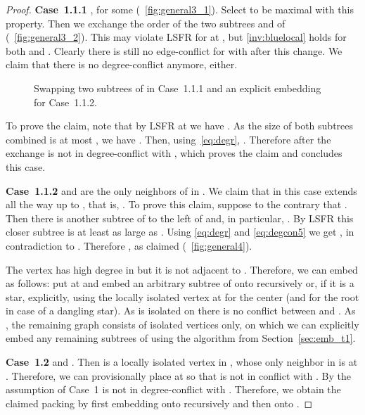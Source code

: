 \documentclass[11pt,a4paper,colorlinks=true,urlcolor=blue,citecolor=red]{article}
\theoremstyle{plain}
\newcommand{\case}[1]{\par\vspace{.5\baselineskip}\noindent\textbf{\sffamily Case~#1}}
\begin{document}
\begin{proof}
  \case{1.1.1} , for some 
  (\figurename~\ref{fig:general3_1}). Select  to be maximal with this
  property. Then we exchange the order of the two subtrees  and
   of  (\figurename~\ref{fig:general3_2}). This may violate LSFR
  for  at , but \ref{inv:bluelocal} holds for both 
  and .
Clearly there is still no edge-conflict for  with 
  after this change. We claim that there is no degree-conflict anymore,
  either.

  \begin{figure}[htbp]
\hfill
    \hfill
    \caption{Swapping two subtrees of  in Case~1.1.1 and an explicit
      embedding for Case~1.1.2.\label{fig:general3}}
  \end{figure}

  To prove the claim, note that by LSFR at  we have
  . As the size of both subtrees combined is at most
  , we have .  Then, using~\eqref{eq:degr},
  .
  Therefore after the exchange  is not in degree-conflict
  with , which proves the claim and concludes this case.

  \case{1.1.2}  and  are the only neighbors of 
  in . We claim that in this case  extends all the way up to
  , that is, .
  To prove this claim, suppose to the contrary that . Then
  there is another subtree of  to the left of  and, in particular,
  . By LSFR this closer subtree is at least as large as . Using \eqref{eq:degr} and
  \eqref{eq:degcon5} we get
  ,
  in contradiction to . Therefore , as
  claimed (\figurename~\ref{fig:general4}).

  The vertex  has high degree in  but it is not adjacent to
  . Therefore, we can embed  as follows: put  at  and
  embed an arbitrary subtree  of  onto  recursively
  or, if it is a star, explicitly, using the locally isolated vertex at
   for the center (and  for the root in case of a dangling
  star). As  is isolated on  there is no conflict between 
  and . As , the remaining graph 
  consists of isolated vertices only, on which we can explicitly embed
  any remaining subtrees of  using the algorithm from
  Section~\ref{sec:emb_t1}.


  \case{1.2}  and . Then  is a
  locally isolated vertex in , whose only neighbor in  is
  at . Therefore, we can provisionally
  place  at  so that  is not in conflict with . By the assumption
  of Case~1  is not in degree-conflict with . Therefore, we obtain
  the claimed packing by first embedding  onto 
  recursively and then  onto .


\end{proof}
\end{document}
